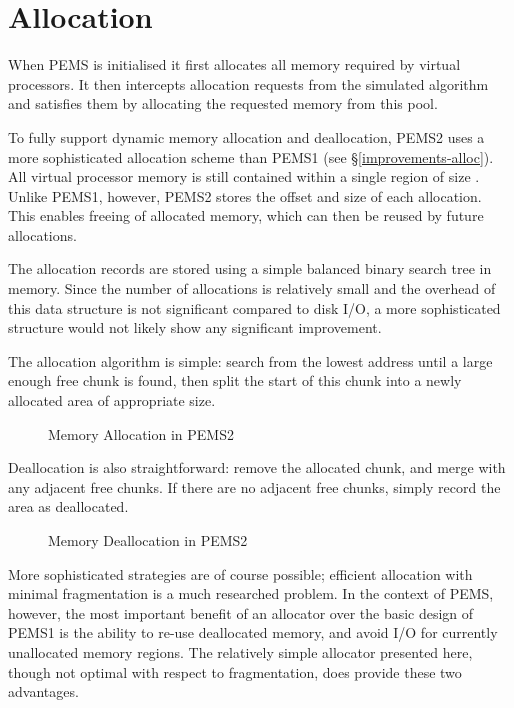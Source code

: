 \documentclass[12pt]{carletoncsthesis}
\begin{document}
\section{Allocation}
\label{allocation-sec}


When PEMS is initialised it first allocates all memory required by virtual
processors.  It then intercepts allocation requests from the simulated algorithm
and satisfies them by allocating the requested memory from this pool.

To fully support dynamic memory allocation and deallocation, PEMS2 uses a more
sophisticated allocation scheme than PEMS1 (see \S\ref{improvements-alloc}).
All virtual processor memory is still contained within a single region of
size .  Unlike PEMS1, however, PEMS2 stores the offset and size of
each allocation.  This enables freeing of allocated memory, which can then
be reused by future allocations.

The allocation records are stored using a simple balanced binary search tree
in memory.  Since the number of allocations is relatively small and the
overhead of this data structure is not significant compared to disk I/O, a
more sophisticated structure would not likely show any significant improvement.

The allocation algorithm is simple: search from the lowest address until a
large enough free chunk is found, then split the start of this chunk into
a newly allocated area of appropriate size.

\begin{figure}[h]
\begin{center}
\end{center}
\caption{Memory Allocation in PEMS2}
\label{pems2-allocation-fig}
\end{figure}

Deallocation is also straightforward: remove the allocated chunk, and merge
with any adjacent free chunks.  If there are no adjacent free chunks, simply
record the area as deallocated.

\begin{figure}[h]
\begin{center}
\end{center}
\caption{Memory Deallocation in PEMS2}
\label{pems2-deallocation-fig}
\end{figure}

More sophisticated strategies are of course possible; efficient allocation
with minimal fragmentation is a much researched problem.  In the context
of PEMS, however, the most important benefit of an allocator over the basic
design of PEMS1 is the ability to re-use deallocated memory, and avoid I/O
for currently unallocated memory regions.  The relatively simple allocator
presented here, though not optimal with respect to fragmentation, does
provide these two advantages.
\end{document}
